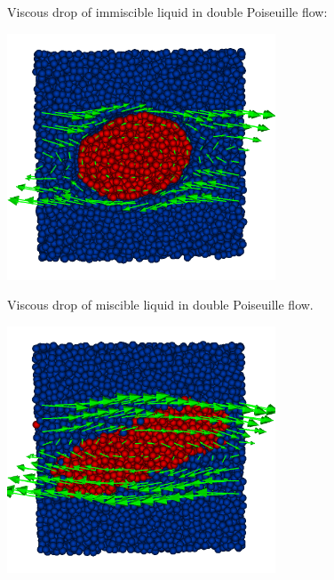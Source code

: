 Viscous drop of immiscible liquid in double Poiseuille flow:
\begin{center}
\includegraphics[width=0.6\textwidth]{i/drop/a/visit.png}
\end{center}

Viscous drop of miscible liquid in double Poiseuille flow.
\begin{center}
\includegraphics[width=0.6\textwidth]{i/drop/b/visit.png}
\end{center}
